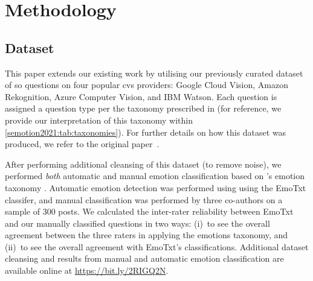 \section{Methodology}\label{semotion2021:sec:methodology}

\subsection{Dataset}

This paper extends our existing work by utilising our previously curated dataset of \SEMNumTotalPostsFromSO{} \gls{so} questions on four popular \gls{cvs} providers: Google Cloud Vision, Amazon Rekognition, Azure Computer Vision, and IBM Watson. Each question is assigned a question type per the taxonomy prescribed in \citet{Beyer:2018fm} (for reference, we provide our interpretation of this taxonomy within \cref{semotion2021:tab:taxonomies}). For further details on how this dataset was produced, we refer to the original paper~\citep{Cummaudo:2020icse}.

After performing additional cleansing of this dataset (to remove noise), we performed \textit{both} automatic and manual emotion classification based on \citeauthor{shaver1987}'s emotion taxonomy \citep{shaver1987}. Automatic emotion detection was performed using using the EmoTxt classifer, and manual classification was performed by three co-authors on a sample of 300 posts. We calculated the inter-rater reliability between EmoTxt and our manually classified questions in two ways: (i)~to see the overall agreement between the three raters in applying the \citeauthor{shaver1987} emotions taxonomy, and (ii)~to see the overall agreement with EmoTxt's classifications. Additional dataset cleansing and results from manual and automatic emotion classification are available online at \url{https://bit.ly/2RIGQ2N}.

